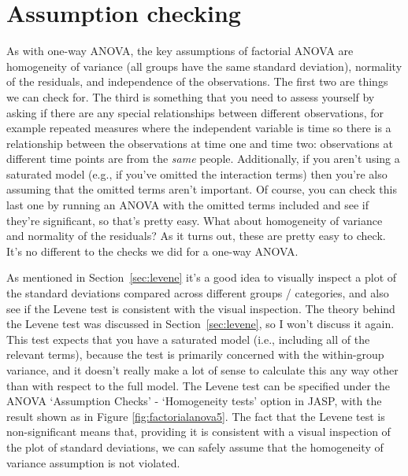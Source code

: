 \section{Assumption checking~\label{sec:factorialanovaassumptions}} 

As with one-way ANOVA, the key assumptions of factorial ANOVA are homogeneity of variance (all groups have the same standard deviation), normality of the residuals, and independence of the observations. The first two are things we can check for. The third is something that you need to assess yourself by asking if there are any special relationships between different observations, for example repeated measures where the independent variable is time so there is a relationship between the observations at time one and time two: observations at different time points are from the {\it same} people. Additionally, if you aren't using a saturated model (e.g., if you've omitted the interaction terms) then you're also assuming that the omitted terms aren't important. Of course, you can check this last one by running an ANOVA with the omitted terms included and see if they're significant, so that's pretty easy. What about homogeneity of variance and normality of the residuals? As it turns out, these are pretty easy to check. It's no different to the checks we did for a one-way ANOVA.


As mentioned in Section~\ref{sec:levene} it's a good idea to visually inspect a plot of the standard deviations compared across different groups / categories, and also see if the Levene test is consistent with the visual inspection. The theory behind the Levene test was discussed in Section~\ref{sec:levene}, so I won't discuss it again. This test expects that you have a saturated model (i.e., including all of the relevant terms), because the test is primarily concerned with the within-group variance, and it doesn't really make a lot of sense to calculate this any way other than with respect to the full model. The Levene test can be specified under the ANOVA `Assumption Checks' - `Homogeneity tests' option in JASP, with the result shown as in Figure \ref{fig:factorialanova5}.  The fact that the Levene test is non-significant means that, providing it is consistent with a visual inspection of the plot of standard deviations, we can safely assume that the homogeneity of variance assumption is not violated.


